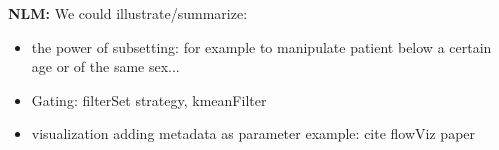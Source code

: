 \documentclass[12pt]{article}
\begin{document}
{\bf NLM:} We could illustrate/summarize:
\begin{itemize}
\item the power of subsetting: for example to manipulate 
patient below a certain age or of the same sex...
\item Gating: filterSet strategy, kmeanFilter
\item visualization adding metadata as parameter
example: cite flowViz paper
\end{itemize}



  
 
\end{document}
